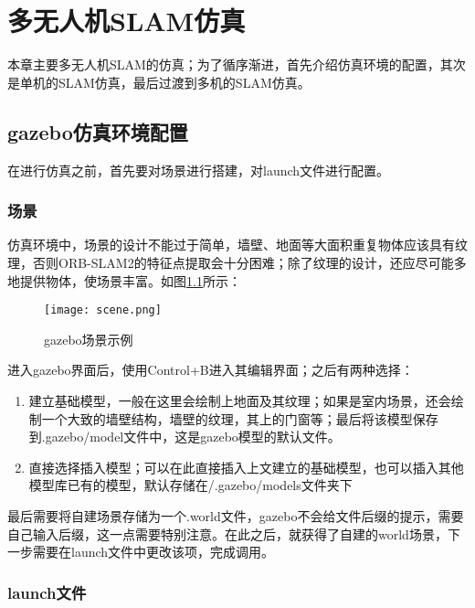 \renewcommand{\baselinestretch}{1.5}
\fontsize{12pt}{13pt}\selectfont

\chapter{多无人机SLAM仿真} \label{Simulation}

本章主要多无人机SLAM的仿真；为了循序渐进，首先介绍仿真环境的配置，其次是单机的SLAM仿真，最后过渡到多机的SLAM仿真。


\section{gazebo仿真环境配置}

在进行仿真之前，首先要对场景进行搭建，对launch文件进行配置。

\subsection{场景} \label{4.1.1}

仿真环境中，场景的设计不能过于简单，墙壁、地面等大面积重复物体应该具有纹理，否则ORB-SLAM2的特征点提取会十分困难；除了纹理的设计，还应尽可能多地提供物体，使场景丰富。如图\ref{fig4-1}所示：

\begin{figure}[!ht]
	\centering
	\texttt{[image: scene.png]}
	\caption{gazebo场景示例}
	\label{fig4-1}
\end{figure}

进入gazebo界面后，使用Control+B进入其编辑界面；之后有两种选择：

\begin{enumerate}
	\item 建立基础模型，一般在这里会绘制上地面及其纹理；如果是室内场景，还会绘制一个大致的墙壁结构，墙壁的纹理，其上的门窗等；最后将该模型保存到.gazebo/model文件中，这是gazebo模型的默认文件。
	\item 直接选择插入模型；可以在此直接插入上文建立的基础模型，也可以插入其他模型库已有的模型，默认存储在/.gazebo/models文件夹下
\end{enumerate}

最后需要将自建场景存储为一个.world文件，gazebo不会给文件后缀的提示，需要自己输入后缀，这一点需要特别注意。在此之后，就获得了自建的world场景，下一步需要在launch文件中更改该项，完成调用。


\subsection{launch文件} \label{4.1.2}

